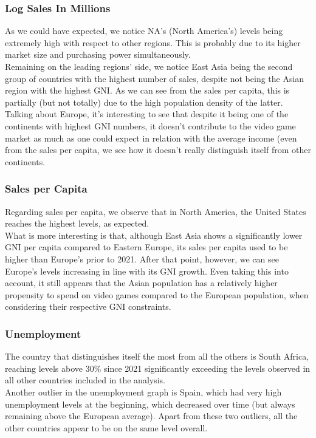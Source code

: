 \subsubsection{Log Sales In Millions}
As we could have expected, we notice NA's (North America's) levels being extremely high with respect to other regions. This is probably due to its higher market size and purchasing power simultaneously.\\
Remaining on the leading regions' side, we notice East Asia being the second group of countries with the highest number of sales, despite not being the Asian region with the highest GNI. As we can see from the sales per capita, this is partially (but not totally) due to the high population density of the latter.\\
Talking about Europe, it's interesting to see that despite it being one of the continents with highest GNI numbers, it doesn't contribute to the video game market as much as one could expect in relation with the average income (even from the sales per capita, we see how it doesn't really distinguish itself from other continents.

\subsubsection{Sales per Capita}
Regarding sales per capita, we observe that in North America, the United States reaches the highest levels, as expected.\\
What is more interesting is that, although East Asia shows a significantly lower GNI per capita compared to Eastern Europe, its sales per capita used to be higher than Europe’s prior to 2021. After that point, however, we can see Europe’s levels increasing in line with its GNI growth. Even taking this into account, it still appears that the Asian population has a relatively higher propensity to spend on video games compared to the European population, when considering their respective GNI constraints.

\subsubsection{Unemployment}
The country that distinguishes itself the most from all the others is South Africa, reaching levels above 30\% since 2021 significantly exceeding the levels observed in all other countries included in the analysis.\\
Another outlier in the unemployment graph is Spain, which had very high unemployment levels at the beginning, which decreased over time (but always remaining above the European average).
Apart from these two outliers, all the other countries appear to be on the same level overall.\\

